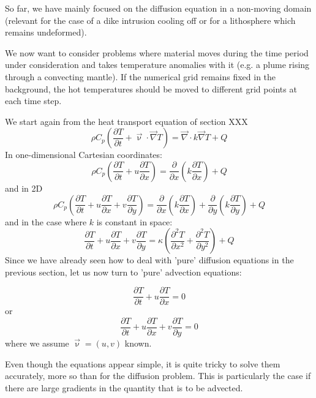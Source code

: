 
So far, we have mainly focused on the diffusion equation in a non-moving domain 
(relevant for the case of a dike intrusion cooling off 
or for a lithosphere which remains undeformed). 

We now want to consider problems where material moves during the time period under 
consideration and takes temperature anomalies with it (e.g. a plume rising 
through a convecting mantle). 
If the numerical grid remains fixed in the background, the hot temperatures should 
be moved to different grid points at each time step. 

We start again from the heat transport equation of section XXX 
\[
\rho C_p \left( \frac{\partial T}{\partial t} + \vec\upnu \cdot \vec\nabla T  \right)=
\vec\nabla \cdot k \vec\nabla T + Q 
\]
In one-dimensional Cartesian coordinates:
\[
\rho C_p \left( \frac{\partial T}{\partial t}  
+ u \frac{\partial T}{\partial x} \right)= 
\frac{\partial }{\partial x} \left(  k  \frac{\partial T}{\partial x} \right)+ Q
\]
and in 2D
\[
\rho C_p \left( \frac{\partial T}{\partial t}   
+ u \frac{\partial T}{\partial x}  
+ v \frac{\partial T}{\partial y} \right) 
=
\frac{\partial }{\partial x} \left(  k  \frac{\partial T}{\partial x} \right)
+
\frac{\partial }{\partial y} \left(  k  \frac{\partial T}{\partial y} \right)
+Q
\]
and in the case where $k$ is constant in space:
\[
\frac{\partial T}{\partial t}   
+ u \frac{\partial T}{\partial x}  
+ v \frac{\partial T}{\partial y} 
=
\kappa \left( 
\frac{\partial^2 T}{\partial x^2} 
+
\frac{\partial^2 T}{\partial y^2} \right)
+Q
\]
Since we have already seen how to deal with 'pure' diffusion equations in the 
previous section, let us now turn to 'pure' advection equations:

\[
\frac{\partial T}{\partial t}  + u \frac{\partial T}{\partial x} = 0
\]
or
\[
\frac{\partial T}{\partial t}  + u \frac{\partial T}{\partial x} + v \frac{\partial T}{\partial y}= 0
\]
where we assume $\vec\upnu=(u,v)$ known. 

Even though the equations appear simple, it is quite tricky to solve them accurately, 
more so than for the diffusion problem. 
This is particularly the case if there are large gradients in the quantity that is to be advected. 





